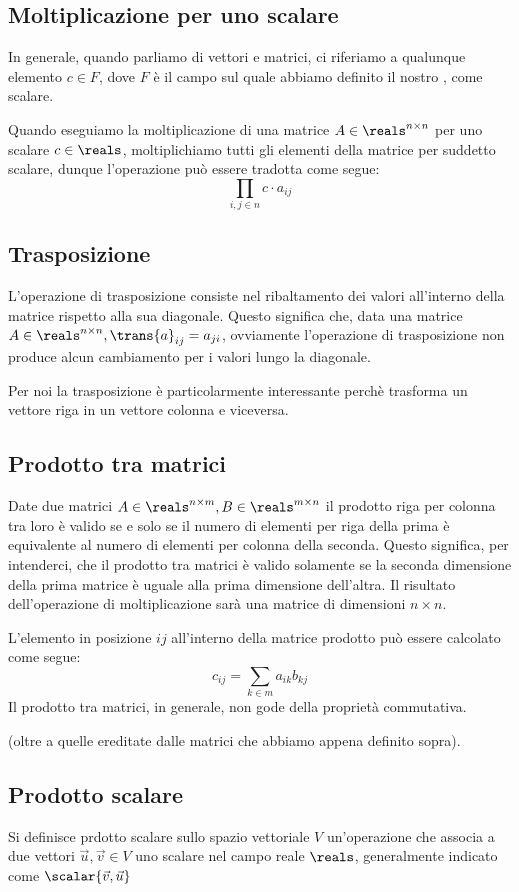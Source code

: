 \subsection{Moltiplicazione per uno scalare}
In generale, quando parliamo di vettori e matrici, ci riferiamo a qualunque elemento $c \in F$, dove $F$ è il campo sul quale abbiamo definito il nostro , come scalare.

Quando eseguiamo la moltiplicazione di una matrice $A \in \reals^{n \times n}$ per uno scalare $c \in \reals$, moltiplichiamo tutti gli elementi della matrice per suddetto scalare, dunque l'operazione può essere tradotta come segue:
\begin{equation*}
    \prod_{i, j \in n} c \cdot a_{ij}
\end{equation*}
\subsection{Trasposizione}
L'operazione di trasposizione consiste nel ribaltamento dei valori all'interno della matrice rispetto alla sua diagonale. Questo significa che, data una matrice $A \in \reals^{n \times n}, \trans{a}_{ij} = a_{ji}$, ovviamente l'operazione di trasposizione non produce alcun cambiamento per i valori lungo la diagonale.

Per noi la trasposizione è particolarmente interessante perchè trasforma un vettore riga in un vettore colonna e viceversa.
\subsection{Prodotto tra matrici}
Date due matrici $A \in \reals^{n \times m}, B \in \reals^{m \times n}$ il prodotto riga per colonna tra loro è valido se e solo se il numero di elementi per riga della prima è equivalente al numero di elementi per colonna della seconda. Questo significa, per intenderci, che il prodotto tra matrici è valido solamente se la seconda dimensione della prima matrice è uguale alla prima dimensione dell'altra.
Il risultato dell'operazione di moltiplicazione sarà una matrice di dimensioni $n \times n$.

L'elemento in posizione $ij$ all'interno della matrice prodotto può essere calcolato come segue:
\begin{equation*}
    c_{ij} = \sum_{k \in m}a_{ik}b_{kj}
\end{equation*}
Il prodotto tra matrici, in generale, non gode della proprietà commutativa.

 (oltre a quelle ereditate dalle matrici che abbiamo appena definito sopra).
\subsection{Prodotto scalare}
Si definisce prdotto scalare sullo spazio vettoriale $V$ un'operazione che associa a due vettori $\vec{u}, \vec{v} \in V$ uno scalare nel campo reale $\reals$, generalmente indicato come $\scalar{\vec{v}, \vec{u}}$



